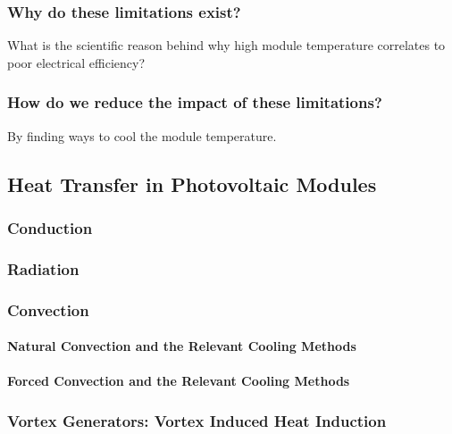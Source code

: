 \subsubsection{Why do these limitations exist?}
What is the scientific reason behind why high module temperature correlates to poor electrical efficiency?\par

\subsubsection{How do we reduce the impact of these limitations?}
By finding ways to cool the module temperature.\par

\pagebreak
\subsection{Heat Transfer in Photovoltaic Modules}
\subsubsection{Conduction} %
\subsubsection{Radiation} %
\subsubsection{Convection} %
\paragraph{Natural Convection and the Relevant Cooling Methods} %
\paragraph{Forced Convection and the Relevant Cooling Methods} %
\subsubsection{Vortex Generators: Vortex Induced Heat Induction} %

